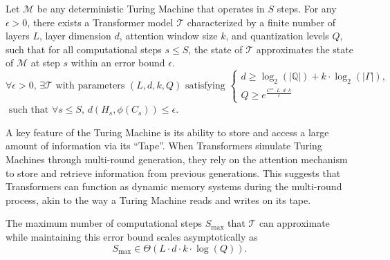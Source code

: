 
\begin{lemma}\label{lemma:Turing-Transformer-Epsilon-Delta}
    Let \(\mathcal{M}\) be any deterministic Turing Machine that operates in \(S\) steps. For any \(\epsilon > 0\), there exists a Transformer model \(\mathcal{T}\) characterized by a finite number of layers \(L\), layer dimension \(d\), attention window size \(k\), and quantization levels \(Q\), such that for all computational steps \(s \leq S\), the state of \(\mathcal{T}\) approximates the state of \(\mathcal{M}\) at step \(s\) within an error bound \(\epsilon\). 
   {\color{black}\[
\forall \epsilon > 0, \, \exists \mathcal{T} \text{ with parameters } (L, d, k, Q) \text{ satisfying } 
\begin{cases}
 d \geq \log_2(|\mathbb{Q}|) + k \cdot \log_2(|\Gamma|), \\
Q \geq e^{\frac{C''' \cdot L \cdot d \cdot k}{\varepsilon}}
\end{cases}\]\(
\text{ such that } \forall s \leq S, \, d(H_s, \phi(C_s)) \leq \epsilon.
\)}
\end{lemma}

A key feature of the Turing Machine is its ability to store and access a large amount of information via its ``Tape''. When Transformers simulate Turing Machines through multi-round generation, they rely on the attention mechanism to store and retrieve information from previous generations. This suggests that Transformers can function as dynamic memory systems during the multi-round process, akin to the way a Turing Machine reads and writes on its tape.
\begin{lemma}\label{lemma:Turing-Transformer}
    
    The maximum number of computational steps \(S_{\text{max}}\) that \(\mathcal{T}\) can approximate while maintaining this error bound scales asymptotically as
    \[
        S_{\text{max}} \in \Theta\left(L \cdot d \cdot k \cdot \log(Q)\right).
    \]
\end{lemma}


